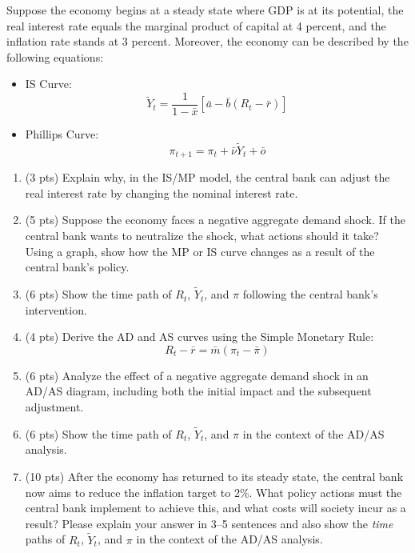 \documentclass[addpoints,12pt,answers]{exam}
\begin{document}
\begin{questions}
\begin{enumerate}[label=(\alph*)]
			
			
		\end{enumerate}
	
		\clearpage

			\question  [40] Suppose the economy begins at a steady state where GDP is at its potential, the real interest rate equals the marginal product of capital at 4 percent, and the inflation rate stands at 3 percent. Moreover, the economy can be described by the following equations:
		\begin{itemize}
			\item IS Curve: 
			\[
			\tilde{Y}_t = \frac{1}{1-\bar{x}}\left[\bar{a} - \bar{b}(R_t-\bar{r})\right]
			\]
			\item Phillips Curve: 
			\[
			\pi_{t+1} = \pi_t + \bar{\nu}\tilde{Y}_t + \bar{o}
			\]
			
		\end{itemize}
		
		\begin{enumerate}[label=(\alph*)]
			\item (3 pts) Explain why, in the IS/MP model, the central bank can adjust the real interest rate by changing the nominal interest rate.
			\item (5 pts) Suppose the economy faces a negative aggregate demand shock. If the central bank wants to neutralize the shock, what actions should it take? Using a graph, show how the MP or IS curve changes as a result of the central bank's policy.
			\item (6 pts) Show the time path of \(R_t\), \(\tilde{Y}_t\), and \(\pi\) following the central bank's intervention.
			\item (4 pts) Derive the AD and AS curves using the Simple Monetary Rule:
			\[
			R_t - \bar{r} = \bar{m} \left(\pi_t - \bar{\pi}\right)
			\]
			\item (6 pts) Analyze the effect of a negative aggregate demand shock in an AD/AS diagram, including both the initial impact and the subsequent adjustment.
			\item (6 pts) Show the time path of \(R_t\), \(\tilde{Y}_t\), and \(\pi\) in the context of the AD/AS analysis.
			\item (10 pts) After the economy has returned to its steady state, the central bank now aims to reduce the inflation target to 2\%. What policy actions must the central bank implement to achieve this, and what costs will society incur as a result? Please explain your answer in 3–5 sentences and also show the \textit{time} paths of \(R_t\), \(\tilde{Y}_t\), and \(\pi\) in the context of the AD/AS analysis.
		\end{enumerate}
		

\end{questions}
\end{document}
